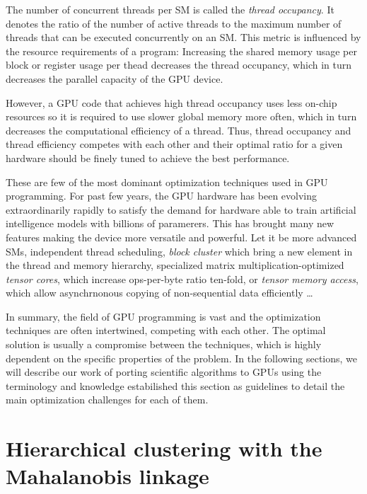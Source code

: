 The number of concurrent threads per SM is called the \emph{thread occupancy}. It denotes the ratio of the number of active threads to the maximum number of threads that can be executed concurrently on an SM. This metric is influenced by the resource requirements of a program: Increasing the shared memory usage per block or register usage per thead decreases the thread occupancy, which in turn decreases the parallel capacity of the GPU device. 

However, a GPU code that achieves high thread occupancy uses less on-chip resources so it is required to use slower global memory more often, which in turn decreases the computational efficiency of a thread. Thus, thread occupancy and thread efficiency competes with each other and their optimal ratio for a given hardware should be finely tuned to achieve the best performance.

\vspace{1cm}

These are few of the most dominant optimization techniques used in GPU programming. For past few years, the GPU hardware has been evolving extraordinarily rapidly to satisfy the demand for hardware able to train artificial intelligence models with billions of paramerers. This has brought many new features making the device more versatile and powerful. Let it be more advanced SMs, independent thread scheduling, \emph{block cluster} which bring a new element in the thread and memory hierarchy, specialized matrix multiplication-optimized \emph{tensor cores}, which increase ops-per-byte ratio ten-fold, or \emph{tensor memory access}, which allow asynchrnonous copying of non-sequential data efficiently \dots 

In summary, the field of GPU programming is vast and the optimization techniques are often intertwined, competing with each other. The optimal solution is usually a compromise between the techniques, which is highly dependent on the specific properties of the problem. In the following sections, we will describe our work of porting scientific algorithms to GPUs using the terminology and knowledge estabilished this section as guidelines to detail the main optimization challenges for each of them.


\section{Hierarchical clustering with the Ma\-ha\-la\-no\-bis linkage}

